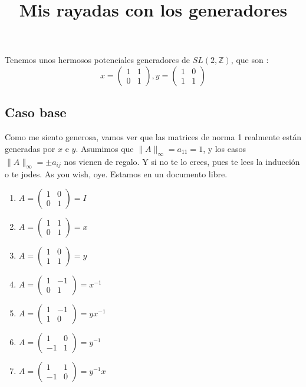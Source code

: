 \documentclass{article}
\title{Mis rayadas con los generadores}
\date{}
\newcommand\tab[1][0.6cm]{\hspace*{#1}}
\newcommand\nl{\newline\tab}
\begin{document}
	\maketitle
	Tenemos unos hermosos potenciales generadores de $ SL(2, \mathbb{Z}) $, que son : 
	$$
	x = 
	\begin{pmatrix}
	1 & 1 \\
	0 & 1 
	\end{pmatrix},	
	y = 
	\begin{pmatrix}
	1 & 0 \\
	1 & 1 
	\end{pmatrix}
	$$
	\nl
	\subsection{Caso base}
	\tab Como me siento generosa, vamos ver que las matrices de norma 1 realmente están generadas por $x$ e $y$.\nl 
	Asumimos que $\|A\|_\infty = a_{11} = 1$, y los casos $\|A\|_\infty = \pm a_{ij}$ nos vienen de regalo. Y si no te lo crees, pues te lees la inducción o te jodes. As you wish, oye. Estamos en un documento libre.
	\begin{enumerate}
		\item
		$
		A = 
		\begin{pmatrix}
		1 & 0 \\
		0 & 1 
		\end{pmatrix} 
		= I
		$
		\item
		$
		A = 
		\begin{pmatrix}
		1 & 1 \\
		0 & 1 
		\end{pmatrix} 
		= x
		$
		\item
		$
		A = 
		\begin{pmatrix}
		1 & 0 \\
		1 & 1 
		\end{pmatrix} 
		= y
		$
		\item
		$
		A = 
		\begin{pmatrix}
		1 & -1 \\
		0 & 1 
		\end{pmatrix} 
		= x^{-1}
		$
		\item
		$
		A = 
		\begin{pmatrix}
		1 & -1 \\
		1 & 0 
		\end{pmatrix} 
		= yx^{-1}
		$			
		\item
		$
		A = 
		\begin{pmatrix}
		1 & 0 \\
		-1 & 1 
		\end{pmatrix} 
		= y^{-1}
		$
		\item
		$
		A = 
		\begin{pmatrix}
		1 & 1 \\
		-1 & 0 			
		\end{pmatrix} 
		= y^{-1}x			
		$					
		
	\end{enumerate}
	
\end{document}

